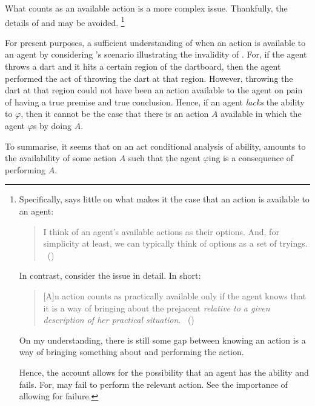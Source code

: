\begin{note}[Availability]
  What counts as an available action is a more complex issue.
  Thankfully, the details of \citeauthor{Mandelkern:2017aa} and \citeauthor{Boylan:2020aa} may be avoided.%
  \footnote{
    Specifically, \citeauthor{Boylan:2020aa} says little on what makes it the case that an action is available to an agent:
    \begin{quote}
      I think of an agent's available actions as their options.
      And, for simplicity at least, we can typically think of options as a set of tryings.%
      \mbox{ }\hfill\mbox{(\citeyear[14]{Boylan:2020aa})}
    \end{quote}
    In contrast, \citeauthor{Mandelkern:2017aa} consider the issue in detail.
    In short:
    \begin{quote}
      [A]n action counts as practically available only if the agent knows that it is a way of bringing about the prejacent \emph{relative to a given description of her practical situation}.\newline
      \mbox{ }\hfill\mbox{(\citeyear[321]{Mandelkern:2017aa})}
    \end{quote}
    On my understanding, there is still some gap between knowing an action is a way of bringing something about and performing the action.

    Hence, the account allows for the possibility that an agent has the ability and fails.
    For, may fail to perform the relevant action.
      See \citeauthor{Maier:2013vk} the importance of allowing for failure.
  }

  For present purposes, a sufficient understanding of when an action is available to an agent by considering \citeauthor{Boylan:2020aa}'s scenario illustrating the invalidity of \BoyVS{}.
  For, if the agent throws a dart and it hits a certain region of the dartboard, then the agent performed the act of throwing the dart at that region.
  However, throwing the dart at that region could not have been an action available to the agent on pain of \BoyVS{} having a true premise and true conclusion.
  Hence, if an agent \emph{lacks} the ability to \(\varphi\), then it cannot be the case that there is an action \(A\) available in which the agent \(\varphi\)s by doing \(A\).
\end{note}

\begin{note}
  To summarise, it seems that on an act conditional analysis of ability, \AbControl{} amounts to the availability of some action \(A\) such that the agent \(\varphi\)ing is a consequence of performing \(A\).
\end{note}

